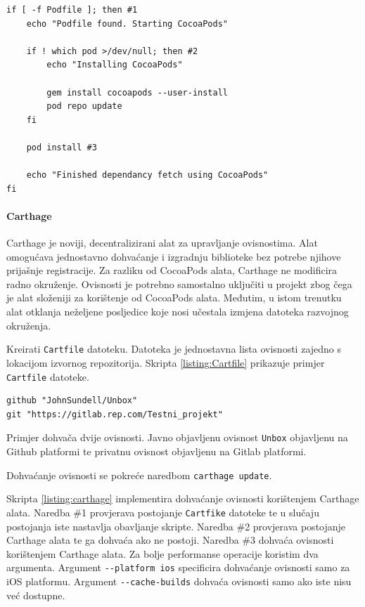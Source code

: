 \documentclass[times, utf8, diplomski, numeric]{fer}
\begin{document}
\begin{lstlisting}[caption=Dohvat ovisnosti korištenjem alata CocoaPods, label=listing:cocoapods]
if [ -f Podfile ]; then #1
    echo "Podfile found. Starting CocoaPods"

    if ! which pod >/dev/null; then #2
        echo "Installing CocoaPods"

        gem install cocoapods --user-install
        pod repo update
    fi

    pod install #3

    echo "Finished dependancy fetch using CocoaPods"
fi
\end{lstlisting}

\paragraph{Carthage}

Carthage je noviji, decentralizirani alat za upravljanje ovisnostima. Alat omogućava jednostavno dohvaćanje i izgradnju biblioteke bez potrebe njihove prijašnje registracije. Za razliku od CocoaPods alata, Carthage ne modificira radno okruženje. Ovisnosti je potrebno samostalno uključiti u projekt zbog čega je alat složeniji za korištenje od CocoaPods alata. Međutim, u istom trenutku alat otklanja neželjene posljedice koje nosi učestala izmjena datoteka razvojnog okruženja.

Kreirati \verb|Cartfile| datoteku. Datoteka je jednostavna lista ovisnosti zajedno s lokacijom izvornog repozitorija. Skripta \ref{listing:Cartfile} prikazuje primjer \verb|Cartfile| datoteke.

\begin{lstlisting}[caption=Primjer Cartfile datoteke, label=listing:Cartfile]
github "JohnSundell/Unbox"
git "https://gitlab.rep.com/Testni_projekt"
\end{lstlisting}

Primjer dohvača dvije ovisnosti. Javno objavljenu ovisnost \verb|Unbox| objavljenu na Github platformi te privatnu ovisnost objavljenu na Gitlab platformi.

Dohvaćanje ovisnosti se pokreće naredbom \verb|carthage update|.

Skripta \ref{listing:carthage} implementira dohvaćanje ovisnosti korištenjem Carthage alata. Naredba \#1 provjerava postojanje \verb|Cartfike| datoteke te u slučaju postojanja iste nastavlja obavljanje skripte. Naredba \#2 provjerava postojanje Carthage alata te ga dohvaća ako ne postoji. Naredba \#3 dohvaća ovisnosti korištenjem Carthage alata. Za bolje performanse operacije koristim dva argumenta. Argument \verb|--platform ios| specificira dohvaćanje ovisnosti samo za iOS platformu. Argument \verb|--cache-builds| dohvaća ovisnosti samo ako iste nisu već dostupne.
\end{document}
